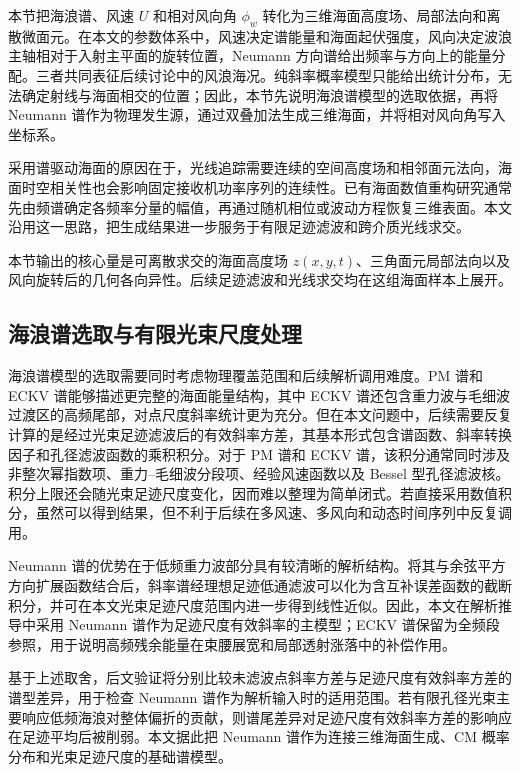 本节把海浪谱、风速 $U$ 和相对风向角 $\phi_w$ 转化为三维海面高度场、局部法向和离散微面元。在本文的参数体系中，风速决定谱能量和海面起伏强度，风向决定波浪主轴相对于入射主平面的旋转位置，Neumann 方向谱给出频率与方向上的能量分配。三者共同表征后续讨论中的风浪海况。纯斜率概率模型只能给出统计分布，无法确定射线与海面相交的位置；因此，本节先说明海浪谱模型的选取依据，再将 Neumann 谱作为物理发生源，通过双叠加法生成三维海面，并将相对风向角写入坐标系。

采用谱驱动海面的原因在于，光线追踪需要连续的空间高度场和相邻面元法向，海面时空相关性也会影响固定接收机功率序列的连续性。已有海面数值重构研究通常先由频谱确定各频率分量的幅值，再通过随机相位或波动方程恢复三维表面。本文沿用这一思路，把生成结果进一步服务于有限足迹滤波和跨介质光线求交。

本节输出的核心量是可离散求交的海面高度场 $z(x,y,t)$、三角面元局部法向以及风向旋转后的几何各向异性。后续足迹滤波和光线求交均在这组海面样本上展开。

\subsection{海浪谱选取与有限光束尺度处理}
\label{subsec:c3_spectrum_choice_beam_interface}

海浪谱模型的选取需要同时考虑物理覆盖范围和后续解析调用难度。PM 谱和 ECKV 谱能够描述更完整的海面能量结构，其中 ECKV 谱还包含重力波与毛细波过渡区的高频尾部，对点尺度斜率统计更为充分。但在本文问题中，后续需要反复计算的是经过光束足迹滤波后的有效斜率方差，其基本形式包含谱函数、斜率转换因子和孔径滤波函数的乘积积分。对于 PM 谱和 ECKV 谱，该积分通常同时涉及非整次幂指数项、重力--毛细波分段项、经验风速函数以及 Bessel 型孔径滤波核。积分上限还会随光束足迹尺度变化，因而难以整理为简单闭式。若直接采用数值积分，虽然可以得到结果，但不利于后续在多风速、多风向和动态时间序列中反复调用。

Neumann 谱的优势在于低频重力波部分具有较清晰的解析结构。将其与余弦平方方向扩展函数结合后，斜率谱经理想足迹低通滤波可以化为含互补误差函数的截断积分，并可在本文光束足迹尺度范围内进一步得到线性近似。因此，本文在解析推导中采用 Neumann 谱作为足迹尺度有效斜率的主模型；ECKV 谱保留为全频段参照，用于说明高频残余能量在束腰展宽和局部透射涨落中的补偿作用。

基于上述取舍，后文验证将分别比较未滤波点斜率方差与足迹尺度有效斜率方差的谱型差异，用于检查 Neumann 谱作为解析输入时的适用范围。若有限孔径光束主要响应低频海浪对整体偏折的贡献，则谱尾差异对足迹尺度有效斜率方差的影响应在足迹平均后被削弱。本文据此把 Neumann 谱作为连接三维海面生成、CM 概率分布和光束足迹尺度的基础谱模型。

